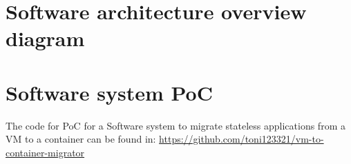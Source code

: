 \documentclass[twocolumn]{article}
\begin{document}
\printbibliography

\onecolumn
\begin{appendices}
\section{Software architecture overview diagram}
\label{appendix:software-arch-overview-diagram}

\section{Software system PoC}
\label{appendix:PoC}
The code for PoC for a Software system to migrate stateless applications from a VM to a container can be found in: \href{https://github.com/toni123321/vm-to-container-migrator}{https://github.com/toni123321/vm-to-container-migrator}
\end{appendices}
\end{document}
